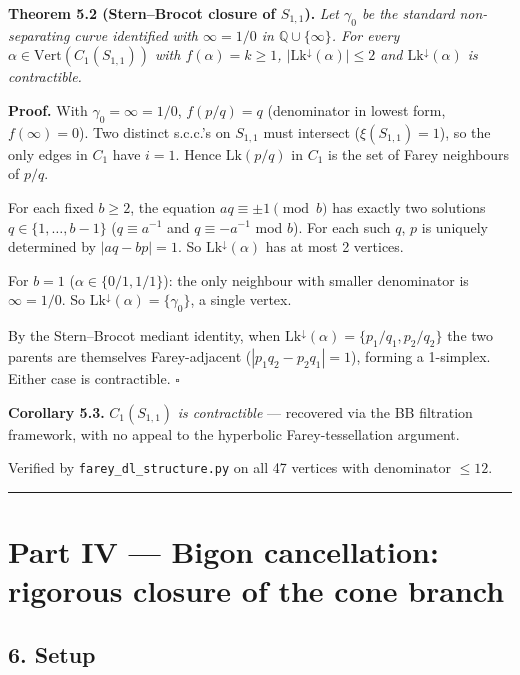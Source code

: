 \documentclass[
]{article}
\begin{document}
\textbf{Theorem 5.2 (Stern--Brocot closure of \(S_{1,1}\)).} \emph{Let
\(\gamma_0\) be the standard non-separating curve identified with
\(\infty = 1/0\) in \(\mathbb Q \cup \{\infty\}\). For every
\(\alpha \in \mathrm{Vert}(C_1(S_{1,1}))\) with \(f(\alpha) = k \ge 1\),
\(|\mathrm{Lk}^\downarrow(\alpha)| \le 2\) and
\(\mathrm{Lk}^\downarrow(\alpha)\) is contractible.}

\textbf{Proof.} With \(\gamma_0 = \infty = 1/0\), \(f(p/q) = q\)
(denominator in lowest form, \(f(\infty) = 0\)). Two distinct s.c.c.'s
on \(S_{1,1}\) must intersect (\(\xi(S_{1,1}) = 1\)), so the only edges
in \(C_1\) have \(i = 1\). Hence \(\mathrm{Lk}(p/q)\) in \(C_1\) is the
set of Farey neighbours of \(p/q\).

For each fixed \(b \ge 2\), the equation \(aq \equiv \pm 1 \pmod b\) has
exactly two solutions \(q \in \{1,\ldots, b-1\}\) (\(q \equiv a^{-1}\)
and \(q \equiv -a^{-1}\) mod \(b\)). For each such \(q\), \(p\) is
uniquely determined by \(|aq - bp| = 1\). So
\(\mathrm{Lk}^\downarrow(\alpha)\) has at most 2 vertices.

For \(b = 1\) (\(\alpha \in \{0/1, 1/1\}\)): the only neighbour with
smaller denominator is \(\infty = 1/0\). So
\(\mathrm{Lk}^\downarrow(\alpha) = \{\gamma_0\}\), a single vertex.

By the Stern--Brocot mediant identity, when
\(\mathrm{Lk}^\downarrow(\alpha) = \{p_1/q_1, p_2/q_2\}\) the two
parents are themselves Farey-adjacent (\(|p_1 q_2 - p_2 q_1| = 1\)),
forming a 1-simplex. Either case is contractible. \(\square\)

\textbf{Corollary 5.3.} \(C_1(S_{1,1})\) \emph{is contractible} ---
recovered via the BB filtration framework, with no appeal to the
hyperbolic Farey-tessellation argument.

Verified by \texttt{farey\_dl\_structure.py} on all 47 vertices with
denominator \(\le 12\).

\begin{center}\rule{0.5\linewidth}{0.5pt}\end{center}

\section{Part IV --- Bigon cancellation: rigorous closure of the cone
branch}\label{part-iv-bigon-cancellation-rigorous-closure-of-the-cone-branch}

\subsection{6. Setup}\label{setup}
\end{document}
